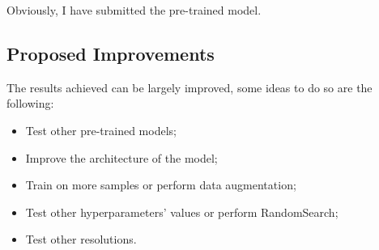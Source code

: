 \documentclass[a4paper]{article}
\begin{document}
Obviously, I have submitted the pre-trained model.
\subsection{Proposed Improvements}
The results achieved can be largely improved, some ideas to do so are the following:
\begin{itemize}
\item Test other pre-trained models;
\item Improve the architecture of the model;
\item Train on more samples or perform data augmentation;
\item Test other hyperparameters' values or perform RandomSearch;
\item Test other resolutions.
\end{itemize}
\end{document}
